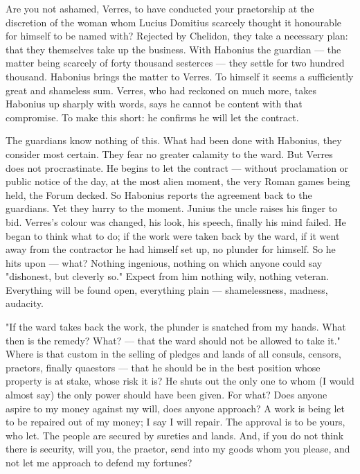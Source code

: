  Are you not ashamed, Verres, to have conducted your praetorship at the discretion of the woman whom Lucius Domitius scarcely thought it honourable for himself to be named with? Rejected by Chelidon, they take a necessary plan: that they themselves take up the business. With Habonius the guardian --- the matter being scarcely of forty thousand sesterces --- they settle for two hundred thousand. Habonius brings the matter to Verres. To himself it seems a sufficiently great and shameless sum. Verres, who had reckoned on much more, takes Habonius up sharply with words, says he cannot be content with that compromise. To make this short: he confirms he will let the contract.

 The guardians know nothing of this. What had been done with Habonius, they consider most certain. They fear no greater calamity to the ward. But Verres does not procrastinate. He begins to let the contract --- without proclamation or public notice of the day, at the most alien moment, the very Roman games being held, the Forum decked. So Habonius reports the agreement back to the guardians. Yet they hurry to the moment. Junius the uncle raises his finger to bid. Verres's colour was changed, his look, his speech, finally his mind failed. He began to think what to do; if the work were taken back by the ward, if it went away from the contractor he had himself set up, no plunder for himself. So he hits upon --- what? Nothing ingenious, nothing on which anyone could say "dishonest, but cleverly so." Expect from him nothing wily, nothing veteran. Everything will be found open, everything plain --- shamelessness, madness, audacity.

 "If the ward takes back the work, the plunder is snatched from my hands. What then is the remedy? What? --- that the ward should not be allowed to take it." Where is that custom in the selling of pledges and lands of all consuls, censors, praetors, finally quaestors --- that he should be in the best position whose property is at stake, whose risk it is? He shuts out the only one to whom (I would almost say) the only power should have been given. For what? Does anyone aspire to my money against my will, does anyone approach? A work is being let to be repaired out of my money; I say I will repair. The approval is to be yours, who let. The people are secured by sureties and lands. And, if you do not think there is security, will you, the praetor, send into my goods whom you please, and not let me approach to defend my fortunes?

